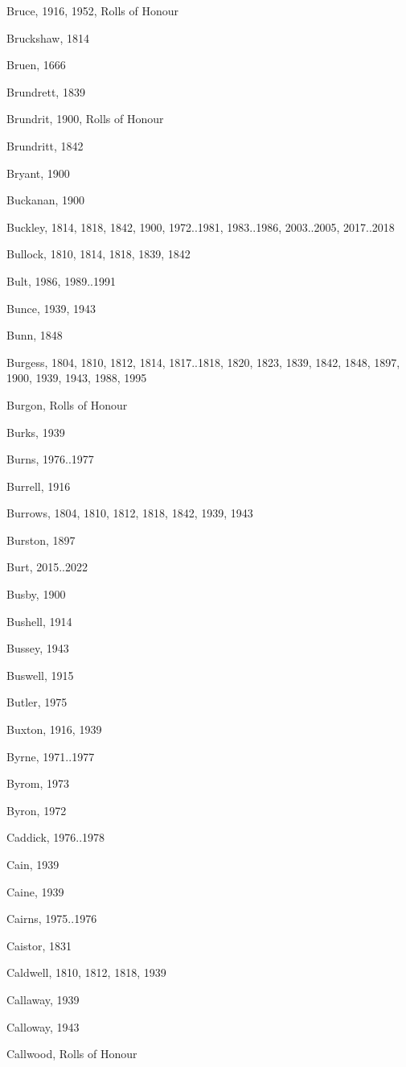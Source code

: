 \begin{theindex}
\item Bruce, 1916, 1952, Rolls of Honour
\item Bruckshaw, 1814
\item Bruen, 1666
\item Brundrett, 1839
\item Brundrit, 1900, Rolls of Honour
\item Brundritt, 1842
\item Bryant, 1900
\item Buckanan, 1900
\item Buckley, 1814, 1818, 1842, 1900, 1972..1981, 1983..1986, 2003..2005, 2017..2018
\item Bullock, 1810, 1814, 1818, 1839, 1842
\item Bult, 1986, 1989..1991
\item Bunce, 1939, 1943
\item Bunn, 1848
\item Burgess, 1804, 1810, 1812, 1814, 1817..1818, 1820, 1823, 1839, 1842, 1848, 1897, 1900, 1939, 1943, 1988, 1995
\item Burgon, Rolls of Honour
\item Burks, 1939
\item Burns, 1976..1977
\item Burrell, 1916
\item Burrows, 1804, 1810, 1812, 1818, 1842, 1939, 1943
\item Burston, 1897
\item Burt, 2015..2022
\item Busby, 1900
\item Bushell, 1914
\item Bussey, 1943
\item Buswell, 1915
\item Butler, 1975
\item Buxton, 1916, 1939
\item Byrne, 1971..1977
\item Byrom, 1973
\item Byron, 1972
\item Caddick, 1976..1978
\item Cain, 1939
\item Caine, 1939
\item Cairns, 1975..1976
\item Caistor, 1831
\item Caldwell, 1810, 1812, 1818, 1939
\item Callaway, 1939
\item Calloway, 1943
\item Callwood, Rolls of Honour

\end{theindex}
